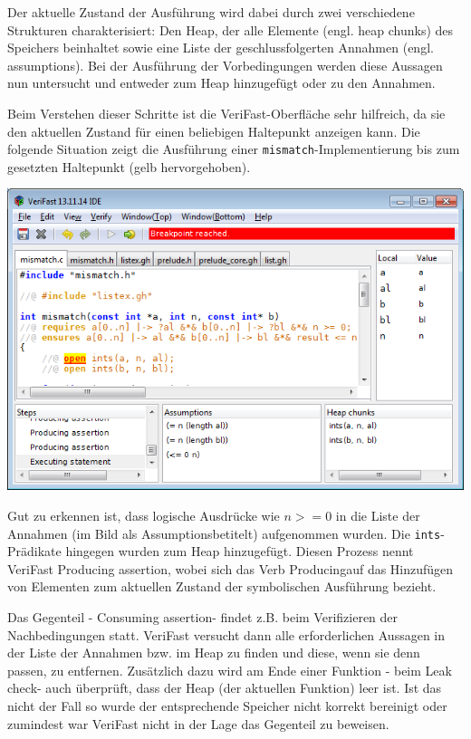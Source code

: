 Der aktuelle Zustand der Ausführung wird dabei durch zwei verschiedene Strukturen charakterisiert: 
Den Heap, der alle Elemente (engl. heap chunks) des Speichers beinhaltet sowie eine Liste
der geschlussfolgerten Annahmen (engl. assumptions). Bei der Ausführung der Vorbedingungen werden
diese Aussagen nun untersucht und entweder zum Heap hinzugefügt oder zu den Annahmen.

Beim Verstehen dieser Schritte ist die VeriFast-Oberfläche sehr hilfreich, da sie den aktuellen
Zustand für einen beliebigen Haltepunkt anzeigen kann. Die folgende Situation zeigt die Ausführung
einer \lstinline{mismatch}-Implementierung bis zum gesetzten Haltepunkt (gelb hervorgehoben).

\begin{center}
\includegraphics[width=1.0\textwidth]{images/VeriFast-state-after-precondition.png}
\end{center}

Gut zu erkennen ist, dass logische Ausdrücke wie \(n >= 0\) in die Liste der Annahmen 
(im Bild als \glqq Assumptions\grqq betitelt) aufgenommen wurden. Die \lstinline{ints}-Prädikate hingegen
wurden zum Heap hinzugefügt. Diesen Prozess nennt VeriFast \glqq Producing assertion\grqq, wobei sich das Verb
\glqq Producing\grqq auf das Hinzufügen von Elementen zum aktuellen Zustand der symbolischen Ausführung
bezieht.

Das Gegenteil - \glqq Consuming assertion\grqq - findet z.B. beim Verifizieren der Nachbedingungen statt.
VeriFast versucht dann alle erforderlichen Aussagen in der Liste der Annahmen bzw. im Heap zu finden
und diese, wenn sie denn passen, zu entfernen. Zusätzlich dazu wird am Ende einer Funktion - beim 
\glqq Leak check\grqq - auch überprüft, dass der Heap (der aktuellen Funktion) leer ist. Ist das nicht 
der Fall so wurde der entsprechende Speicher nicht korrekt bereinigt oder zumindest war VeriFast nicht 
in der Lage das Gegenteil zu beweisen.

